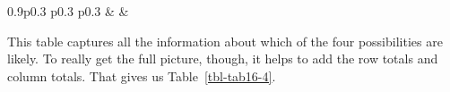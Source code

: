 \documentclass[
  a4paper,
]{book}
\begin{document}
\begin{table}[ht]
\begin{centerbox}
\begin{threeparttable}
\begin{tabularx}{0.9\textwidth}{p{} p{} p{}}
 &
 &
 \tabularnewline[-0.5pt]


\end{tabularx} 

\end{threeparttable}\par\end{centerbox}

\end{table}
 

This table captures all the information about which of the four
possibilities are likely. To really get the full picture, though, it
helps to add the row totals and column totals. That gives us
Table~\ref{tbl-tab16-4}.

\hypertarget{tbl-tab16-4}{}
 
  \providecommand{\huxb}[2]{\arrayrulecolor[RGB]{#1}\global\arrayrulewidth=#2pt}
  \providecommand{\huxvb}[2]{\color[RGB]{#1}\vrule width #2pt}
  \providecommand{\huxtpad}[1]{\rule{0pt}{#1}}
  \providecommand{\huxbpad}[1]{\rule[-#1]{0pt}{#1}}
\end{document}
